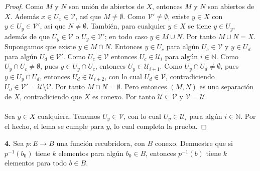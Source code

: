\begin{proof}
Como $M$ y $N$ son unión de abiertos de $X$, entonces $M$ y $N$ son abiertos de $X$. Además $x\in U_x\in\mathcal{V}$, así que $M\neq\emptyset$. Como $\mathcal{V}'\neq\emptyset$, existe $y\in X$ con $y\in U_y\in\mathcal{V}'$, así que $N\neq\emptyset$. También, para cualquier $y\in X$ se tiene $y\in U_y$, además de que $U_y\in\mathcal{V}$ o $U_y\in\mathcal{V}'$; en todo caso $y\in M\cup N$. Por tanto $M\cup N=X$. Supongamos que existe $y\in M\cap N$. Entonces $y\in U_c$ para algún $U_c\in\mathcal{V}$ y $y\in U_d$ para algún $U_d\in\mathcal{V}'$. Como $U_c\in\mathcal{V}$ entonces $U_c\in\mathcal{U}_i$ para algún $i\in\mathbb{N}$. Como $U_y\cap U_c\neq\emptyset$, pues $y\in U_y\cap U_c$, entonces $U_y\in\mathcal{U}_{i+1}$. Como $U_y\cap U_d\neq\emptyset$, pues $y\in U_y\cap U_d$, entonces $U_d\in\mathcal{U}_{i+2}$, con lo cual $U_d\in\mathcal{V}$, contradiciendo $U_d\in\mathcal{V}'=\mathcal{U}\setminus\mathcal{V}$. Por tanto $M\cap N=\emptyset$. Pero entonces $(M,N)$ es una separación de $X$, contradiciendo que $X$ es conexo. Por tanto $\mathcal{U}\subseteq\mathcal{V}$ y $\mathcal{V}=\mathcal{U}$.\\\\
Sea $y\in X$ cualquiera. Tenemos $U_y\in\mathcal{V}$, con lo cual $U_y\in\mathcal{U}_i$ para algún $i\in\mathbb{N}$. Por el hecho, el lema se cumple para $y$, lo cual completa la prueba.
\end{proof}\clearpage
\textbf{4.} Sea $p:E\to B$ una función recubridora, con $B$ conexo. Demuestre que si $p^{-1}(b_0)$ tiene $k$ elementos para algún $b_0\in B$, entonces $p^{-1}(b)$ tiene $k$ elementos para todo $b\in B$.

